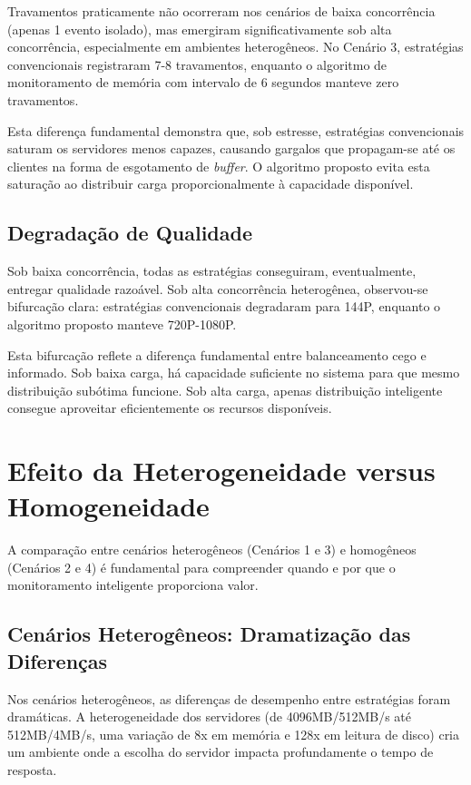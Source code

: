 Travamentos praticamente não ocorreram nos cenários de baixa concorrência (apenas 1 evento isolado), mas emergiram significativamente sob alta concorrência, especialmente em ambientes heterogêneos. No Cenário 3, estratégias convencionais registraram 7-8 travamentos, enquanto o algoritmo de monitoramento de memória com intervalo de 6 segundos manteve zero travamentos.

Esta diferença fundamental demonstra que, sob estresse, estratégias convencionais saturam os servidores menos capazes, causando gargalos que propagam-se até os clientes na forma de esgotamento de \textit{buffer}. O algoritmo proposto evita esta saturação ao distribuir carga proporcionalmente à capacidade disponível.

\subsection{Degradação de Qualidade}

Sob baixa concorrência, todas as estratégias conseguiram, eventualmente, entregar qualidade razoável. Sob alta concorrência heterogênea, observou-se bifurcação clara: estratégias convencionais degradaram para 144P, enquanto o algoritmo proposto manteve 720P-1080P.

Esta bifurcação reflete a diferença fundamental entre balanceamento cego e informado. Sob baixa carga, há capacidade suficiente no sistema para que mesmo distribuição subótima funcione. Sob alta carga, apenas distribuição inteligente consegue aproveitar eficientemente os recursos disponíveis.

\section{Efeito da Heterogeneidade versus Homogeneidade}

A comparação entre cenários heterogêneos (Cenários 1 e 3) e homogêneos (Cenários 2 e 4) é fundamental para compreender quando e por que o monitoramento inteligente proporciona valor.

\subsection{Cenários Heterogêneos: Dramatização das Diferenças}

Nos cenários heterogêneos, as diferenças de desempenho entre estratégias foram dramáticas. A heterogeneidade dos servidores (de 4096MB/512MB/s até 512MB/4MB/s, uma variação de 8x em memória e 128x em leitura de disco) cria um ambiente onde a escolha do servidor impacta profundamente o tempo de resposta.


